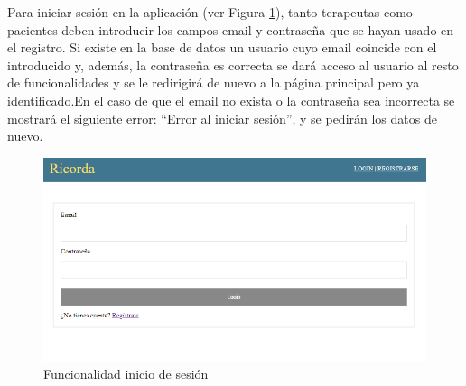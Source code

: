 Para iniciar sesión en la aplicación (ver Figura \ref{fig:funcionalidadlogin}), tanto terapeutas como pacientes deben introducir los campos email y contraseña que se hayan usado en el registro. Si existe en la base de datos un usuario cuyo email coincide con el introducido y, además, la contraseña es correcta se dará acceso al usuario al resto de funcionalidades y se le redirigirá de nuevo a la página principal pero ya identificado.En el caso de que el email no exista o la contraseña sea incorrecta se mostrará el siguiente error: ``Error al iniciar sesión'', y se pedirán los datos de nuevo.

\begin{figure}[h]
	\centering
	\includegraphics[scale=0.7]{Imagenes/Vectorial/funcionalidad_login1}
	\caption{Funcionalidad inicio de sesión}
	\label{fig:funcionalidadlogin}
\end{figure}

